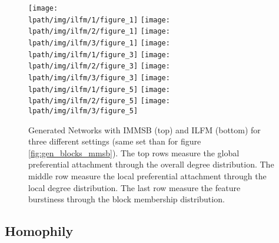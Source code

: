 \documentclass[a4paper, 12pt]{article}
\begin{document}
\begin{figure}[ht]
	\texttt{[image: \\lpath/img/ilfm/1/figure\_1]}
	\endminipage
	\texttt{[image: \\lpath/img/ilfm/2/figure\_1]}
	\endminipage
	\texttt{[image: \\lpath/img/ilfm/3/figure\_1]}
	\endminipage
		\vspace{-0.29cm}
	\texttt{[image: \\lpath/img/ilfm/1/figure\_3]}
	\endminipage
	\texttt{[image: \\lpath/img/ilfm/2/figure\_3]} 
	\endminipage
	\texttt{[image: \\lpath/img/ilfm/3/figure\_3]}
	\endminipage
		\vspace{-0.28cm}
	\texttt{[image: \\lpath/img/ilfm/1/figure\_5]}
	\endminipage
	\texttt{[image: \\lpath/img/ilfm/2/figure\_5]} 
	\endminipage
	\texttt{[image: \\lpath/img/ilfm/3/figure\_5]}
	\endminipage
    \caption{\tiny{Generated Networks with IMMSB (top) and ILFM (bottom) for three different settings (same set than for figure \ref{fig:gen_blocks_mmsb}). The top rows measure the global preferential attachment through the overall degree distribution. The middle row measure the local preferential attachment through the local degree distribution. The last row measure the feature burstiness through the block membership distribution.}}
	\label{fig:gen_burst}
\end{figure}

\clearpage

\subsection{Homophily}
\end{document}
